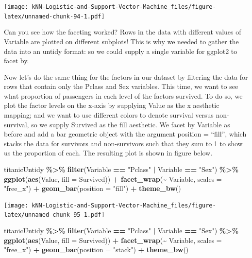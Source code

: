 \documentclass[
]{article}
\newenvironment{Shaded}{\begin{snugshade}}{\end{snugshade}}
\newcommand{\AttributeTok}[1]{\textcolor[rgb]{0.13,0.29,0.53}{#1}}
\newcommand{\FunctionTok}[1]{\textcolor[rgb]{0.13,0.29,0.53}{\textbf{#1}}}
\newcommand{\NormalTok}[1]{#1}
\newcommand{\SpecialCharTok}[1]{\textcolor[rgb]{0.81,0.36,0.00}{\textbf{#1}}}
\newcommand{\StringTok}[1]{\textcolor[rgb]{0.31,0.60,0.02}{#1}}
\begin{document}
\texttt{[image: kNN-Logistic-and-Support-Vector-Machine\_files/figure-latex/unnamed-chunk-94-1.pdf]}

Can you see how the faceting worked? Rows in the data with different
values of Variable are plotted on different subplots! This is why we
needed to gather the data into an untidy format: so we could supply a
single variable for ggplot2 to facet by.

Now let's do the same thing for the factors in our dataset by filtering
the data for rows that contain only the Pclass and Sex variables. This
time, we want to see what proportion of passengers in each level of the
factors survived. To do so, we plot the factor levels on the x-axis by
supplying Value as the x aesthetic mapping; and we want to use different
colors to denote survival versus non-survival, so we supply Survived as
the fill aesthetic. We facet by Variable as before and add a bar
geometric object with the argument position = ``fill'', which stacks the
data for survivors and non-survivors such that they sum to 1 to show us
the proportion of each. The resulting plot is shown in figure below.

\begin{Shaded}
\begin{Highlighting}[]
\NormalTok{titanicUntidy }\SpecialCharTok{\%\textgreater{}\%}
  \FunctionTok{filter}\NormalTok{(Variable }\SpecialCharTok{==} \StringTok{"Pclass"} \SpecialCharTok{|}\NormalTok{ Variable }\SpecialCharTok{==} \StringTok{"Sex"}\NormalTok{) }\SpecialCharTok{\%\textgreater{}\%}
  \FunctionTok{ggplot}\NormalTok{(}\FunctionTok{aes}\NormalTok{(Value, }\AttributeTok{fill =}\NormalTok{ Survived)) }\SpecialCharTok{+}
  \FunctionTok{facet\_wrap}\NormalTok{(}\SpecialCharTok{\textasciitilde{}}\NormalTok{ Variable, }\AttributeTok{scales =} \StringTok{"free\_x"}\NormalTok{) }\SpecialCharTok{+}
  \FunctionTok{geom\_bar}\NormalTok{(}\AttributeTok{position =} \StringTok{"fill"}\NormalTok{) }\SpecialCharTok{+}
\FunctionTok{theme\_bw}\NormalTok{()}
\end{Highlighting}
\end{Shaded}

\texttt{[image: kNN-Logistic-and-Support-Vector-Machine\_files/figure-latex/unnamed-chunk-95-1.pdf]}

\begin{Shaded}
\begin{Highlighting}[]
\NormalTok{titanicUntidy }\SpecialCharTok{\%\textgreater{}\%}
  \FunctionTok{filter}\NormalTok{(Variable }\SpecialCharTok{==} \StringTok{"Pclass"} \SpecialCharTok{|}\NormalTok{ Variable }\SpecialCharTok{==} \StringTok{"Sex"}\NormalTok{) }\SpecialCharTok{\%\textgreater{}\%}
  \FunctionTok{ggplot}\NormalTok{(}\FunctionTok{aes}\NormalTok{(Value, }\AttributeTok{fill =}\NormalTok{ Survived)) }\SpecialCharTok{+}
  \FunctionTok{facet\_wrap}\NormalTok{(}\SpecialCharTok{\textasciitilde{}}\NormalTok{ Variable, }\AttributeTok{scales =} \StringTok{"free\_x"}\NormalTok{) }\SpecialCharTok{+}
  \FunctionTok{geom\_bar}\NormalTok{(}\AttributeTok{position =} \StringTok{"stack"}\NormalTok{) }\SpecialCharTok{+}
\FunctionTok{theme\_bw}\NormalTok{()}
\end{Highlighting}
\end{Shaded}
\end{document}
